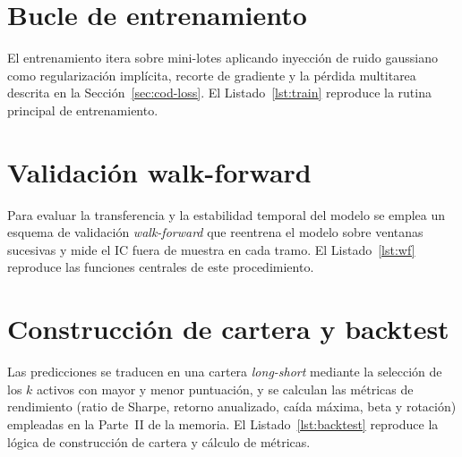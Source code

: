 \section{Bucle de entrenamiento}\label{sec:cod-train}

El entrenamiento itera sobre mini-lotes aplicando inyección de ruido gaussiano como
regularización implícita, recorte de gradiente y la pérdida multitarea descrita en la
Sección~\ref{sec:cod-loss}. El Listado~\ref{lst:train} reproduce la rutina principal
de entrenamiento.



\section{Validación walk-forward}\label{sec:cod-wf}

Para evaluar la transferencia y la estabilidad temporal del modelo se emplea un
esquema de validación \emph{walk-forward} que reentrena el modelo sobre ventanas
sucesivas y mide el IC fuera de muestra en cada tramo. El Listado~\ref{lst:wf}
reproduce las funciones centrales de este procedimiento.



\section{Construcción de cartera y backtest}\label{sec:cod-backtest}

Las predicciones se traducen en una cartera \emph{long-short} mediante la selección de
los $k$ activos con mayor y menor puntuación, y se calculan las métricas de
rendimiento (ratio de Sharpe, retorno anualizado, caída máxima, beta y rotación)
empleadas en la Parte~II de la memoria. El Listado~\ref{lst:backtest} reproduce la
lógica de construcción de cartera y cálculo de métricas.



